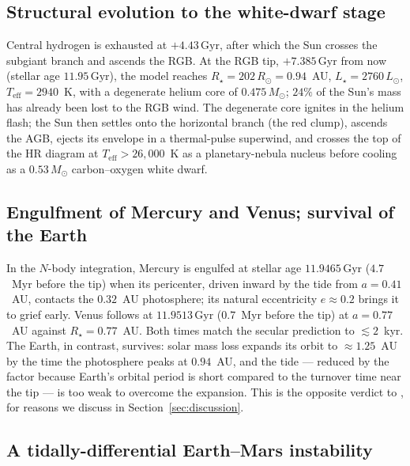 \documentclass[twocolumn]{aastex631}
\newcommand{\msun}{M_\odot}
\newcommand{\rsun}{R_\odot}
\newcommand{\lsun}{L_\odot}
\newcommand{\teff}{T_{\mathrm{eff}}}
\newcommand{\gyr}{\,\mathrm{Gyr}}
\begin{document}
\subsection{Structural evolution to the white-dwarf stage}

Central hydrogen is exhausted at $+4.43\gyr$, after which the Sun crosses the
subgiant branch and ascends the RGB. At the RGB tip, $+7.385\gyr$ from now (stellar
age $11.95\gyr$), the model reaches $R_\star=202\,\rsun=0.94$~AU,
$L_\star=2760\,\lsun$, $\teff=2940$~K, with a degenerate helium core of
$0.475\,\msun$; $24\%$ of the Sun's mass has already been lost to the RGB wind. The
degenerate core ignites in the helium flash; the Sun then settles onto the
horizontal branch (the red clump), ascends the AGB, ejects its envelope in a
thermal-pulse superwind, and crosses the top of the HR diagram at
$\teff>26{,}000$~K as a planetary-nebula nucleus before cooling as a $0.53\,\msun$
carbon--oxygen white dwarf.

\subsection{Engulfment of Mercury and Venus; survival of the Earth}

In the $N$-body integration, Mercury is engulfed at stellar age $11.9465\gyr$
($4.7$~Myr before the tip) when its pericenter, driven inward by the tide from
$a=0.41$~AU, contacts the $0.32$~AU photosphere; its natural eccentricity
$e\approx0.2$ brings it to grief early. Venus follows at $11.9513\gyr$
($0.7$~Myr before the tip) at $a=0.77$~AU against $R_\star=0.77$~AU. Both times match
the secular prediction to $\lesssim2$~kyr. The Earth, in contrast, survives: solar
mass loss expands its orbit to $\approx1.25$~AU by the time the photosphere peaks at
$0.94$~AU, and the tide --- reduced by the \citet{GoldreichNicholson1977} factor
because Earth's orbital period is short compared to the turnover time near the tip
--- is too weak to overcome the expansion. This is the opposite verdict to
\citet{Schroder2008}, for reasons we discuss in Section~\ref{sec:discussion}.

\subsection{A tidally-differential Earth--Mars instability}
\label{sec:earthmars}
\end{document}
